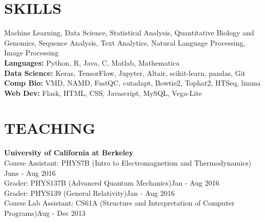 \documentclass{res}
\begin{document}
\begin{resume}
\section{SKILLS}
Machine Learning, Data Science, Statistical Analysis, Quantitative Biology and Genomics, Sequence Analysis, Text Analytics, Natural Language Processing, Image Processing %
\\ \textbf{Languages:} Python, R, Java, C, Matlab, Mathematica
\\ \textbf{Data Science:} Keras, TensorFlow, Jupyter, Altair, scikit-learn, pandas, Git
\\ \textbf{Comp Bio:} VMD, NAMD, FastQC, cutadapt, Bowtie2, Tophat2, HTSeq, limma
\\ \textbf{Web Dev:} Flask, HTML, CSS, Javascript, MySQL, Vega-Lite
\vspace{-10pt}
\section{TEACHING}
   \textbf{University of California at Berkeley}
   \\Course Assistant: PHYS7B (Intro to Electromagnetism and Thermodynamics) \hfill June - Aug 2016
   \\Grader: PHYS137B (Advanced Quantum Mechanics)\hfill Jan - Aug 2016
   \\Grader: PHYS139 (General Relativity)\hfill Jan - Aug 2016
   \\Course Lab Assistant: CS61A (Structure and Interpretation of Computer Programs)\hfill Aug - Dec 2013
\vspace{-10pt}

\end{resume}
\end{document}
